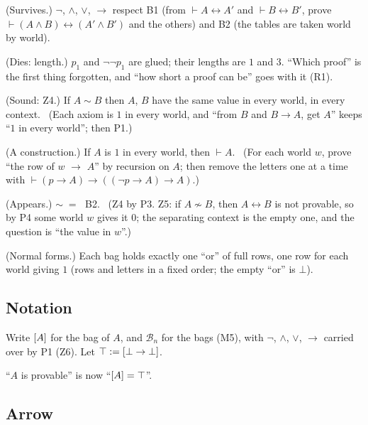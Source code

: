 \begin{lines}
\item[\lab{P1}] (Survives.) $\neg$, $\wedge$, $\vee$, $\to$ respect B1 (from $\vdash A \leftrightarrow A'$ and $\vdash B \leftrightarrow B'$, prove $\vdash (A \wedge B) \leftrightarrow (A' \wedge B')$ and the others) and B2 (the tables are taken world by world).
\item[\lab{P2}] (Dies: length.) $p_1$ and $\neg\neg p_1$ are glued; their lengths are $1$ and $3$. ``Which proof'' is the first thing forgotten, and ``how short a proof can be'' goes with it (R1).
\item[\lab{P3}] (Sound: Z4.) If $A \sim B$ then $A$, $B$ have the same value in every world, in every context. \ (Each axiom is $1$ in every world, and ``from $B$ and $B \to A$, get $A$'' keeps ``$1$ in every world''; then P1.)
\item[\lab{P4}] (A construction.) If $A$ is $1$ in every world, then $\vdash A$. \ (For each world $w$, prove ``the row of $w$ $\to$ $A$'' by recursion on $A$; then remove the letters one at a time with $\vdash (p \to A) \to ((\neg p \to A) \to A)$.)
\item[\lab{P5}] (Appears.) $\sim \;=\;$ B2. \ (Z4 by P3. Z5: if $A \not\sim B$, then $A \leftrightarrow B$ is not provable, so by P4 some world $w$ gives it $0$; the separating context is the empty one, and the question is ``the value in $w$''.)
\item[\lab{P6}] (Normal forms.) Each bag holds exactly one ``or'' of full rows, one row for each world giving $1$ (rows and letters in a fixed order; the empty ``or'' is $\bot$).
\end{lines}

\subsection*{Notation}

\begin{lines}
\item[\lab{N1}] Write $[A]$ for the bag of $A$, and $\mathcal{B}_n$ for the bags (M5), with $\neg$, $\wedge$, $\vee$, $\to$ carried over by P1 (Z6). Let $\top := [\bot \to \bot]$.
\item[\lab{N2}] ``$A$ is provable'' is now ``$[A] = \top$''.
\end{lines}

\subsection*{Arrow}

